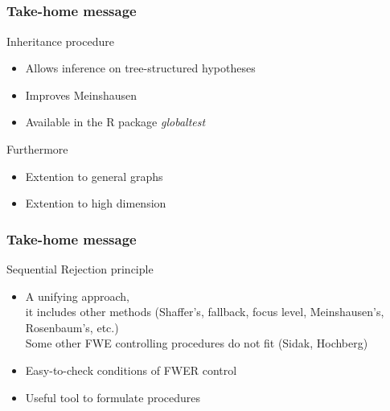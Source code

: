 \documentclass[xcolor={pdftex,dvipsnames,table}]{beamer}
\newcommand{\bb}[1]{\begin{block}{#1}}
\newcommand{\eb}{\end{block}}
\newcommand{\bi}{\begin {itemize}}
\newcommand{\ei}{\end{itemize}}
\newcommand{\bfr}[1]{\begin{frame} \frametitle{#1}}
\begin{document}


\subsection{}
\bfr{Take-home message}

\bb{Inheritance procedure}
  \bi 
    \item Allows inference on tree-structured hypotheses
    \item Improves Meinshausen
    \item Available in the R package \emph{globaltest}
	\ei
\eb

\bb{Furthermore}
    \bi 
    \item Extention to general graphs
    \item Extention to high dimension
     \ei
\eb

\end{frame}

\bfr{Take-home message}

\bb{Sequential Rejection principle}
\bi
\item A unifying approach, \\
it includes other methods (Shaffer's, fallback, focus level, Meinshausen's, Rosenbaum's, etc.)\\  
Some other FWE controlling procedures do not fit (Sidak, Hochberg)
\item Easy-to-check conditions of FWER control
\item Useful tool to formulate procedures
\ei
\eb
\end{frame}

% 
% 
% 


\end{document}
